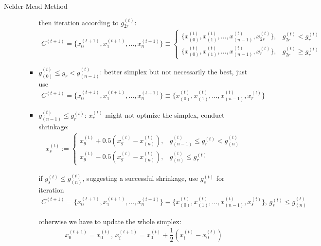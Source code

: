 \begin{algorithm}{Nelder-Mead Method}
\begin{enumerate}[topsep=2pt,itemsep=2pt]
\begin{enumerate}[topsep=2pt,itemsep=2pt]
\begin{itemize}[topsep=2pt,itemsep=0pt]
        then iteration according to $ g_{2r}^{(t)} $:
    \begin{align}
    C^{(t+1)}=\{x_0^{(t+1)},x_1^{(t+1)},\ldots ,x_n^{(t+1)}\}\equiv\begin{cases}
         \{x_{(0)}^{(t)},x_{(1)}^{(t)},\ldots,x_{(n-1)}^{(t)},x_{2r}^{(t)}\},& g_{2r}^{(t)}<g_{r}^{(t)}\\
         \{x_{(0)}^{(t)},x_{(1)}^{(t)},\ldots,x_{(n-1)}^{(t)},x_{r}^{(t)}\},& g_{2r}^{(t)}\geq g_{r}^{(t)}
    \end{cases}
    \end{align}
        \item $ g_{(0)}^{(t)}\leq g_{r}<g_{(n-1)}^{(t)} $: better simplex but not necessarily the best, just use
    \begin{align}
    C^{(t+1)}=\{x_0^{(t+1)},x_1^{(t+1)},\ldots ,x_n^{(t+1)}\}\equiv \{x_{(0)}^{(t)},x_{(1)}^{(t)},\ldots,x_{(n-1)}^{(t)},x_{r}^{(t)}\}
    \end{align}
        
        \item $ g_{(n-1)}^{(t)}\leq g_{r}^{(t)}$: $ x_r^{(t)} $ might not optmize the simplex, conduct shrinkage:
        \begin{align}
            x_s^{(t)}:= \begin{cases}
            x_g^{(t)}+0.5(x_g^{(t)}-x_{(n)}^{(t)}),&g_{(n-1)}^{(t)}\leq g_{r}^{(t)}<g_{(n)}^{(t)}\\
            x_g^{(t)}-0.5(x_g^{(t)}-x_{(n)}^{(t)}),&g_{(n)}^{(t)}\leq g_{r}^{(t)}
            \end{cases}
        \end{align}
        
        if $ g_s^{(t)}\leq g_{(n)}^{(t)} $, suggesting a successful shrinkage, use $ g_s^{(t)} $ for iteration
        \begin{align}
            C^{(t+1)}=\{x_0^{(t+1)},x_1^{(t+1)},\ldots ,x_n^{(t+1)}\}\equiv \{x_{(0)}^{(t)},x_{(1)}^{(t)},\ldots,x_{(n-1)}^{(t)},x_{s}^{(t)}\},\, g_s^{(t)}\leq g_{(n)}^{(t)}
        \end{align}
        
         otherwise we have to update the whole simplex:
         \begin{align}
             x_0^{(t+1)}=x_0^{(t)},\, x_i^{(t+1)}=x_0^{(t)}+\dfrac{1}{2}(x_{i}^{(t)}-x_0^{(t)})
         \end{align}
    \end{itemize}
    \end{enumerate}
\end{enumerate}
    
\end{algorithm}
    
